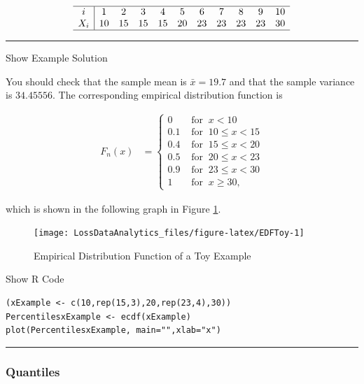 \documentclass[]{book}
\theoremstyle{definition}
\theoremstyle{definition}
\theoremstyle{definition}
\theoremstyle{remark}
\begin{document}
\[\begin{array}{c|cccccccccc}
\hline
i &1&2&3&4&5&6&7&8&9&10 \\
X_i& 10 &15 &15 &15 &20 &23 &23 &23 &23 &30\\
\hline
\end{array}\]

\begin{center}\rule{0.5\linewidth}{\linethickness}\end{center}

Show Example Solution

\hypertarget{toggleExampleToy}{}
You should check that the sample mean is \(\bar{x} = 19.7\) and that the
sample variance is \(34.45556\). The corresponding empirical
distribution function is

\[\begin{aligned}
F_n(x) &=
\left\{
\begin{array}{ll}
0 & \text{ for }\ x<10 \\
0.1 & \text{ for }\ 10 \leq x<15 \\
0.4 & \text{ for }\ 15 \leq x<20 \\
0.5 & \text{ for }\ 20 \leq x<23 \\
0.9 & \text{ for }\ 23 \leq x<30 \\
1 & \text{ for }\ x \geq 30,
\end{array}
\right.\end{aligned}\]

which is shown in the following graph in Figure \ref{fig:EDFToy}.

\begin{figure}

{\centering \texttt{[image: LossDataAnalytics\_files/figure-latex/EDFToy-1]} 

}

\caption{Empirical Distribution Function of a Toy Example}\label{fig:EDFToy}
\end{figure}

Show R Code

\hypertarget{toggleToy}{}
\begin{verbatim}
(xExample <- c(10,rep(15,3),20,rep(23,4),30))
PercentilesxExample <- ecdf(xExample)
plot(PercentilesxExample, main="",xlab="x")
\end{verbatim}

\begin{center}\rule{0.5\linewidth}{\linethickness}\end{center}

\subsubsection{Quantiles}\label{S:QuantileEstimator}
\end{document}

